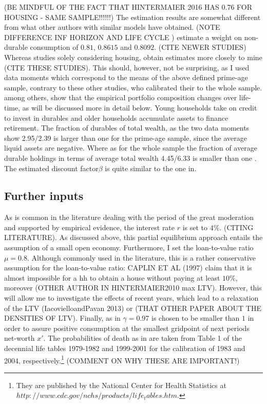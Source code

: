 \documentclass[a4paper,12pt]{article}
\begin{document}
(BE MINDFUL OF THE FACT THAT HINTERMAIER 2016 HAS 0.76 FOR HOUSING - SAME SAMPLE!!!!!!) 
The estimation results are somewhat different from what other authors with similar models have obtained. (NOTE DIFFERENCE INF HORIZON AND LIFE CYCLE ) \cite{FV&K2011} estimate a weight on non-durable consumption of $0.81$, \cite{yang2009} $0.8615$ and \cite{hintermaier2010} $0.8092$. (CITE NEWER STUDIES) Whereas studies solely considering housing, obtain estimates more closely to mine (CITE THESE STUDIES). This should, however, not be surprising, as I used data moments which correspond to the means of the above defined prime-age sample, contrary to these other studies, who calibrated their to the whole sample. \cite{diaz2010} among others, show that the empirical portfolio composition changes over life-time, as will be discussed more in detail below. Young households take on credit to invest in durables and older households accumulate assets to finance retirement. The fraction of durables of total wealth, as the two data moments show 2.95/2.39 is larger than one for the prime-age sample, since the average liquid assets are negative. Where as for the whole sample the fraction of average durable holdings in terms of average total wealth 4.45/6.33 is smaller than one \citep{hintermaier2010}. The estimated  discount factor$\beta$ is quite similar to the one in\cite{hintermaier2011}. 

\subsection{Further inputs}

As is common in the literature dealing with the period of the great moderation and supported by empirical evidence, the interest rate $r$ is set to $4\%$. (CITING LITERATURE). As discussed above, this partial equilibrium approach entails the assumption of a small open economy. Furthermore, I set the loan-to-value ratio $\mu = 0.8$. Although commonly used in the literature, this is a rather conservative assumption for the loan-to-value ratio: CAPLIN ET AL (1997) claim that it is almost impossible for a hh to obtain a house without paying at least $10\%$, moreover (OTHER AUTHOR IN HINTERMAIER2010 max LTV). However, this will allow me to investigate the effects of recent years, which lead to a relaxation of the LTV (IacovielloandPavan 2013) or (THAT OTHER PAPER ABOUT THE DENSITIES OF LTV). Finally, as in \cite{hintermaier2010} $\gamma = 0.97$ is chosen to be smaller than $1$ in order to assure positive consumption at the smallest gridpoint of next periods net-worth $x'$. The probabilities of death as in \cite{hintermaier2011} are taken from Table 1 of the decennial life tables 1979-1982 and 1999-2001 for the calibration of 1983 and 2004, respectively.\footnote{They are published by the National Center for Health Statistics at $http://www.cdc.gov/nchs/products/life_tables.htm$.} (COMMENT ON WHY THESE ARE IMPORTANT!)
\end{document}
